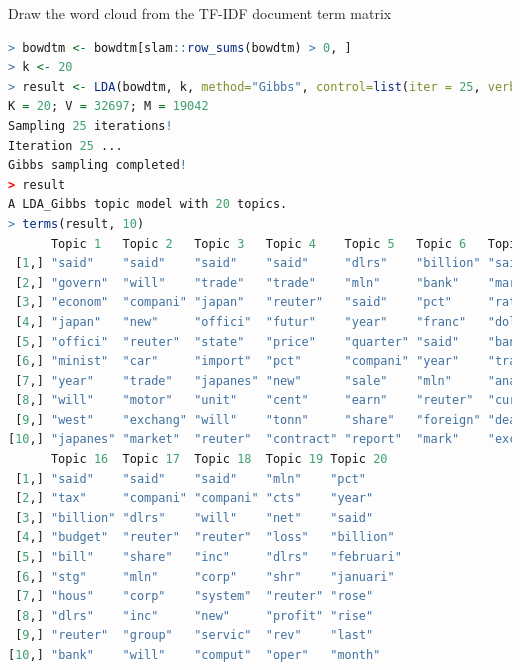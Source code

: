\documentclass{article}
\begin{document}
Draw the word cloud from the TF-IDF document term matrix
\begin{lstlisting}[language=R]
  > bowdtm <- bowdtm[slam::row_sums(bowdtm) > 0, ]
> k <- 20
> result <- LDA(bowdtm, k, method="Gibbs", control=list(iter = 25, verbose = 25, alpha = 0.1))
K = 20; V = 32697; M = 19042
Sampling 25 iterations!
Iteration 25 ...
Gibbs sampling completed!
> result
A LDA_Gibbs topic model with 20 topics.
> terms(result, 10)
      Topic 1   Topic 2   Topic 3   Topic 4    Topic 5   Topic 6   Topic 7   Topic 8      Topic 9    Topic 10  Topic 11  Topic 12  Topic 13  Topic 14 Topic 15 
 [1,] "said"    "said"    "said"    "said"     "dlrs"    "billion" "said"    "tonn"       "bank"     "said"    "said"    "oil"     "said"    "pct"    "said"   
 [2,] "govern"  "will"    "trade"   "trade"    "mln"     "bank"    "market"  "said"       "said"     "share"   "reuter"  "said"    "export"  "will"   "share"  
 [3,] "econom"  "compani" "japan"   "reuter"   "said"    "pct"     "rate"    "mln"        "debt"     "compani" "mine"    "price"   "will"    "issu"   "stock"  
 [4,] "japan"   "new"     "offici"  "futur"    "year"    "franc"   "dollar"  "wheat"      "loan"     "stock"   "gold"    "gas"     "produc"  "said"   "compani"
 [5,] "offici"  "reuter"  "state"   "price"    "quarter" "said"    "bank"    "export"     "billion"  "reuter"  "will"    "barrel"  "price"   "mln"    "inc"    
 [6,] "minist"  "car"     "import"  "pct"      "compani" "year"    "trade"   "reuter"     "dlrs"     "court"   "compani" "product" "coffe"   "bond"   "dlrs"   
 [7,] "year"    "trade"   "japanes" "new"      "sale"    "mln"     "analyst" "agricultur" "will"     "offer"   "ton"     "mln"     "reuter"  "dlrs"   "offer"  
 [8,] "will"    "motor"   "unit"    "cent"     "earn"    "reuter"  "currenc" "year"       "interest" "file"    "oper"    "compani" "meet"    "rate"   "will"   
 [9,] "west"    "exchang" "will"    "tonn"     "share"   "foreign" "dealer"  "grain"      "countri"  "board"   "ounc"    "dlrs"    "countri" "reuter" "reuter" 
[10,] "japanes" "market"  "reuter"  "contract" "report"  "mark"    "exchang" "crop"       "new"      "inc"     "power"   "will"    "quota"   "manag"  "common" 
      Topic 16  Topic 17  Topic 18  Topic 19 Topic 20  
 [1,] "said"    "said"    "said"    "mln"    "pct"     
 [2,] "tax"     "compani" "compani" "cts"    "year"    
 [3,] "billion" "dlrs"    "will"    "net"    "said"    
 [4,] "budget"  "reuter"  "reuter"  "loss"   "billion" 
 [5,] "bill"    "share"   "inc"     "dlrs"   "februari"
 [6,] "stg"     "mln"     "corp"    "shr"    "januari" 
 [7,] "hous"    "corp"    "system"  "reuter" "rose"    
 [8,] "dlrs"    "inc"     "new"     "profit" "rise"    
 [9,] "reuter"  "group"   "servic"  "rev"    "last"    
[10,] "bank"    "will"    "comput"  "oper"   "month"  
\end{lstlisting}
\end{document}
